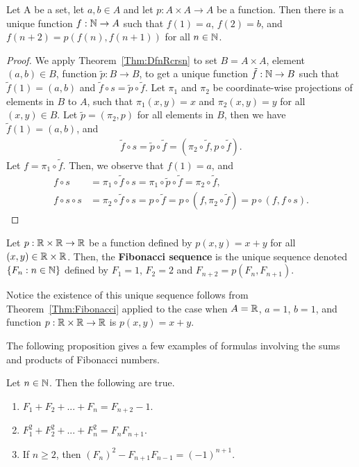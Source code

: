 \documentclass[a4paper,english,12pt]{article}
\begin{document}
\begin{thm}\label{Thm:Fibonacci} Let A be a set, let $a, b \in A$ and let $p : A \times A \to A$ be a function. Then there is a unique function $f : \mathbb{N} \to A$ such that $f(1) = a$, $f(2) = b$, and $f(n + 2) = p(f(n), f(n + 1))$ for all $n \in \mathbb{N}$. 
\end{thm}
\begin{proof} We apply Theorem~\ref{Thm:DfnRcrsn} to set $B = A \times A$, element $(a,b) \in B$, function $\tilde{p}: B \to B$, to get a unique function $\tilde{f}: \mathbb{N} \to B$ such that $\tilde{f}(1) = (a,b)$ and $\tilde{f} \circ s = \tilde{p} \circ \tilde{f}$. Let $\pi_1$  and $\pi_2$ be coordinate-wise projections of elements in $B$ to $A$, such that $\pi_1(x,y) = x$ and $\pi_2(x,y) = y$ for all $(x,y) \in B$. %
Let $\tilde{p} = (\pi_2, p)$ for all elements in $B$, then we have $\tilde{f}(1) = (a,b)$, and 
\begin{align*}
\tilde{f} \circ s = \tilde{p} \circ \tilde{f} = (\pi_2 \circ \tilde{f},  p \circ \tilde{f}). 
\end{align*}
Let $f = \pi_1 \circ \tilde{f}$. Then, we observe that $f(1) = a$, and 
\begin{align*}
f \circ s &= \pi_1 \circ \tilde{f} \circ s = \pi_1 \circ \tilde{p} \circ \tilde{f} = \pi_2 \circ \tilde{f},\\
f \circ s \circ s &= \pi_2 \circ \tilde{f} \circ s = p \circ \tilde{f} = p \circ (f , \pi_2 \circ \tilde{f}) = p \circ (f , f \circ s).
\end{align*}
\end{proof}
\begin{defn} Let $p : \mathbb{R} \times \mathbb{R} \to \mathbb{R}$ be a function defined by $p(x,y)=x+y$ for all $(x,y)\in \mathbb{R} \times \mathbb{R}$. Then, the \textbf{Fibonacci sequence} is the unique sequence denoted $\{F_n : n \in \mathbb{N} \}$ defined by $F_1 = 1$, $F_2 = 2$ and $F_{n+2} = p(F_n, F_{n+1})$.
\end{defn}
\begin{rem} Notice the existence of this unique sequence follows from Theorem~\ref{Thm:Fibonacci} applied to the case when $A = \mathbb{R}$, $a = 1$, $b = 1$, and function $p : \mathbb{R} \times \mathbb{R} \to \mathbb{R}$ is $p(x,y) = x+y$.
\end{rem}
The following proposition gives a few examples of formulas involving the sums and products of Fibonacci numbers.
\begin{prop} Let $n\in \mathbb{N}$. Then the following are true.
\begin{enumerate}
\item $F_1 + F_2 + . . . + F_n = F_{n+2} - 1$.
\item $F_1^2 + F_2^2 + . . . + F_n^2 = F_nF_{n+1}$.
\item If $n \geq 2$, then $(F_n)^2 - F_{n+1}F_{n-1}=(-1)^{n+1}$.
\end{enumerate}
\end{prop}
\end{document}
